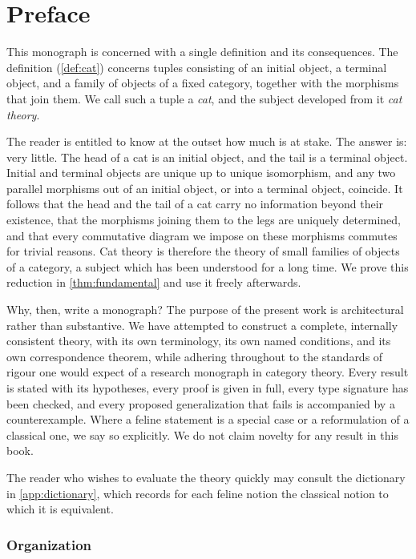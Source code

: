 \chapter*{Preface}

This monograph is concerned with a single definition and its consequences.
The definition (\cref{def:cat}) concerns tuples consisting of an initial object,
a terminal object, and a family of objects of a fixed category, together with
the morphisms that join them. We call such a tuple a \emph{cat}, and the
subject developed from it \emph{cat theory}.

The reader is entitled to know at the outset how much is at stake. The answer
is: very little. The head of a cat is an initial object, and the tail is a
terminal object. Initial and terminal objects are unique up to unique
isomorphism, and any two parallel morphisms out of an initial object, or into
a terminal object, coincide. It follows that the head and the tail of a cat
carry no information beyond their existence, that the morphisms joining them
to the legs are uniquely determined, and that every commutative diagram we
impose on these morphisms commutes for trivial reasons. Cat theory is
therefore the theory of small families of objects of a category, a subject
which has been understood for a long time. We prove this reduction in
\cref{thm:fundamental} and use it freely afterwards.

Why, then, write a monograph? The purpose of the present work is
architectural rather than substantive. We have attempted to construct a
complete, internally consistent theory, with its own terminology, its own
named conditions, and its own correspondence theorem, while adhering
throughout to the standards of rigour one would expect of a research
monograph in category theory. Every result is stated with its hypotheses,
every proof is given in full, every type signature has been checked, and every
proposed generalization that fails is accompanied by a counterexample. Where
a feline statement is a special case or a reformulation of a classical one, we
say so explicitly. We do not claim novelty for any result in this book.

The reader who wishes to evaluate the theory quickly may consult the
dictionary in \cref{app:dictionary}, which records for each feline notion the
classical notion to which it is equivalent.

\subsection*{Organization}

